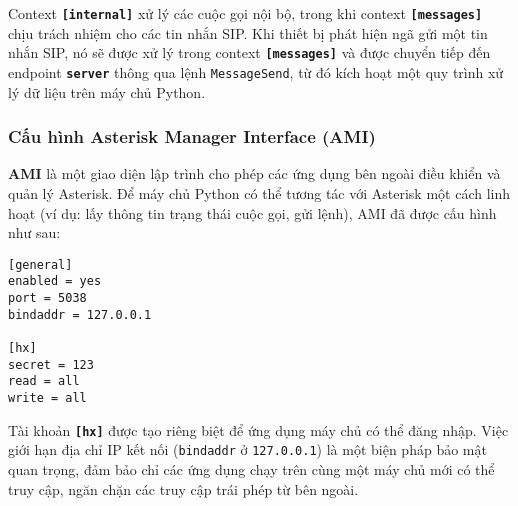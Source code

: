Context \textbf{\texttt{[internal]}} xử lý các cuộc gọi nội bộ, trong khi context \textbf{\texttt{[messages]}} chịu trách nhiệm cho các tin nhắn SIP. Khi thiết bị phát hiện ngã gửi một tin nhắn SIP, nó sẽ được xử lý trong context \textbf{\texttt{[messages]}} và được chuyển tiếp đến endpoint \textbf{\texttt{server}} thông qua lệnh \texttt{MessageSend}, từ đó kích hoạt một quy trình xử lý dữ liệu trên máy chủ Python.

\subsubsection{Cấu hình Asterisk Manager Interface (AMI)}

\textbf{AMI} là một giao diện lập trình cho phép các ứng dụng bên ngoài điều khiển và quản lý Asterisk. Để máy chủ Python có thể tương tác với Asterisk một cách linh hoạt (ví dụ: lấy thông tin trạng thái cuộc gọi, gửi lệnh), AMI đã được cấu hình như sau:

\begin{verbatim}
[general]
enabled = yes
port = 5038
bindaddr = 127.0.0.1

[hx]
secret = 123
read = all
write = all
\end{verbatim}

Tài khoản \textbf{\texttt{[hx]}} được tạo riêng biệt để ứng dụng máy chủ có thể đăng nhập. Việc giới hạn địa chỉ IP kết nối (\texttt{bindaddr} ở \texttt{127.0.0.1}) là một biện pháp bảo mật quan trọng, đảm bảo chỉ các ứng dụng chạy trên cùng một máy chủ mới có thể truy cập, ngăn chặn các truy cập trái phép từ bên ngoài.
